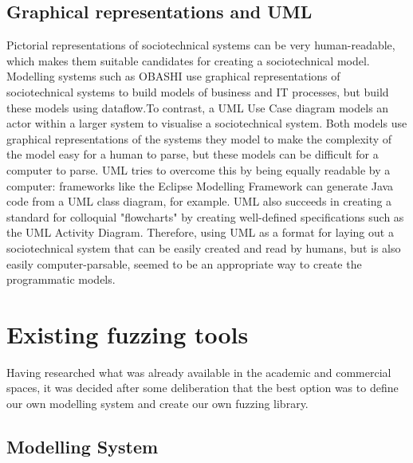 \subsection{Graphical representations and UML}
\label{pictorial}
Pictorial representations of sociotechnical systems can be very human-readable, which makes them suitable candidates for creating a sociotechnical model. Modelling systems such as OBASHI\cite{ObashiMethodology} use graphical representations of sociotechnical systems to build models of business and IT processes, but build these models using dataflow.To contrast, a UML Use Case diagram\cite{Omg2010} models an actor within a larger system to visualise a sociotechnical system. Both models use graphical representations of the systems they model to make the complexity of the model easy for a human to parse, but these models can be difficult for a computer to parse. UML tries to overcome this by being equally readable by a computer: frameworks like the Eclipse Modelling Framework can generate Java code from a UML class diagram, for example\cite{EMFManual}. UML also succeeds in creating a standard for colloquial "flowcharts" by creating well-defined specifications such as the UML Activity Diagram. Therefore, using UML as a format for laying out a sociotechnical system that can be easily created and read by humans, but is also easily computer-parsable, seemed to be an appropriate way to create the programmatic models.


\section{Existing fuzzing tools}  
\label{planning_head}
Having researched what was already available in the academic and commercial spaces, it was decided after some deliberation that the best option was to define our own modelling system and create our own fuzzing library. 

\subsection{Modelling System}\label{planning_modelling}
